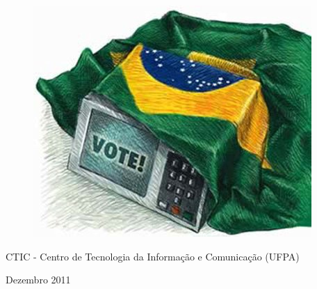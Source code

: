 \thispagestyle{empty}

\begin{center}
  \begin{figure}[H]
    \begin{center}
      \hspace{-1cm}
      \includegraphics[width=0.55\columnwidth]{titlepage}
  ~\cite{FrontPageIMG}
    \end{center}      
  \end{figure}

  \vskip 2cm

  \hspace{-1cm}
  \begin{minipage}[c]{17cm}
    \begin{center}

{\huge {}\vskip 0.15cm %

{\large CTIC - Centro de Tecnologia da Informação e Comunicação (UFPA)} %
}
    \end{center}
  \end{minipage}

  \vskip 11cm

  {\Huge Dezembro 2011} %

\end{center}
